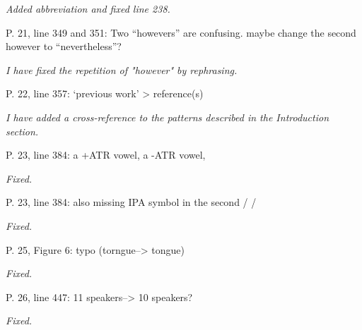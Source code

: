 \documentclass[]{article}
\begin{document}
\begin{adjustwidth}{1cm}{} \textit{
Added abbreviation and fixed line 238.
} \end{adjustwidth}

P. 21, line 349 and 351: Two ``howevers'' are confusing. maybe change
the second however to ``nevertheless''?

\begin{adjustwidth}{1cm}{} \textit{
I have fixed the repetition of "however" by rephrasing.
} \end{adjustwidth}

P. 22, line 357: `previous work' \textgreater{} reference(s)

\begin{adjustwidth}{1cm}{} \textit{
I have added a cross-reference to the patterns described in the Introduction section.
} \end{adjustwidth}

P. 23, line 384: a +ATR vowel, a -ATR vowel,

\begin{adjustwidth}{1cm}{} \textit{
Fixed.
} \end{adjustwidth}

P. 23, line 384: also missing IPA symbol in the second / /

\begin{adjustwidth}{1cm}{} \textit{
Fixed.
} \end{adjustwidth}

P. 25, Figure 6: typo (torngue--\textgreater{} tongue)

\begin{adjustwidth}{1cm}{} \textit{
Fixed.
} \end{adjustwidth}

P. 26, line 447: 11 speakers--\textgreater{} 10 speakers?

\begin{adjustwidth}{1cm}{} \textit{
Fixed.
} \end{adjustwidth}
\end{document}
